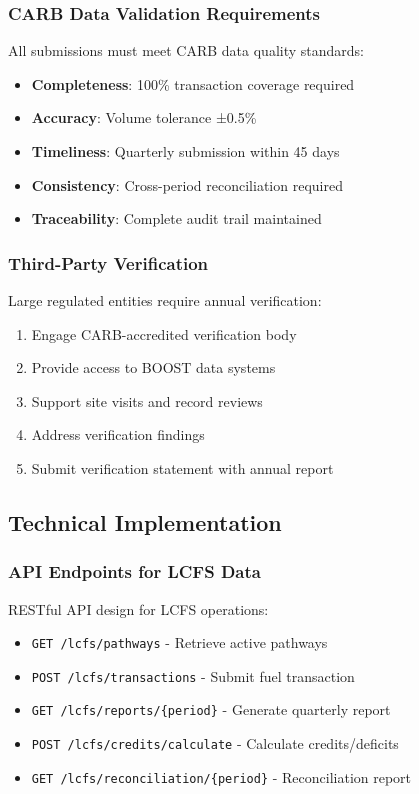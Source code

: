 \subsubsection{CARB Data Validation Requirements}

All submissions must meet CARB data quality standards:

\begin{itemize}
    \item \textbf{Completeness}: 100\% transaction coverage required
    \item \textbf{Accuracy}: Volume tolerance ±0.5\%
    \item \textbf{Timeliness}: Quarterly submission within 45 days
    \item \textbf{Consistency}: Cross-period reconciliation required
    \item \textbf{Traceability}: Complete audit trail maintained
\end{itemize}

\subsubsection{Third-Party Verification}

Large regulated entities require annual verification:

\begin{enumerate}
    \item Engage CARB-accredited verification body
    \item Provide access to BOOST data systems
    \item Support site visits and record reviews
    \item Address verification findings
    \item Submit verification statement with annual report
\end{enumerate}

\subsection{Technical Implementation}
\label{sec:lcfs-technical}

\subsubsection{API Endpoints for LCFS Data}

RESTful API design for LCFS operations:

\begin{itemize}
    \item \texttt{GET /lcfs/pathways} - Retrieve active pathways
    \item \texttt{POST /lcfs/transactions} - Submit fuel transaction
    \item \texttt{GET /lcfs/reports/\{period\}} - Generate quarterly report
    \item \texttt{POST /lcfs/credits/calculate} - Calculate credits/deficits
    \item \texttt{GET /lcfs/reconciliation/\{period\}} - Reconciliation report
\end{itemize}

